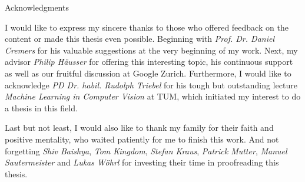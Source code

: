 \thispagestyle{empty}

\vspace*{20mm}

\begin{center}
{ Acknowledgments}
\end{center}

\vspace{10mm}

I would like to express my sincere thanks to those who offered feedback on the content or made this thesis even possible. Beginning with \textit{Prof. Dr. Daniel Cremers} for his valuable suggestions at the very beginning of my work. Next, my advisor \textit{Philip Häusser} for offering this interesting topic, his continuous support as well as our fruitful discussion at Google Zurich. Furthermore, I would like to acknowledge \textit{PD Dr. habil. Rudolph Triebel} for his tough but outstanding lecture \textit{Machine Learning in Computer Vision} at TUM, which initiated my interest to do a thesis in this field.


Last but not least, I would also like to thank my family for their faith and positive mentality, who waited patiently for me to finish this work. And not forgetting \textit{Shiv Baishya}, \textit{Tom Kingdom}, \textit{Stefan Kraus}, \textit{Patrick Mutter}, \textit{Manuel Sautermeister} and \textit{Lukas Wöhrl} for investing their time in proofreading this thesis.

\cleardoublepage{}
